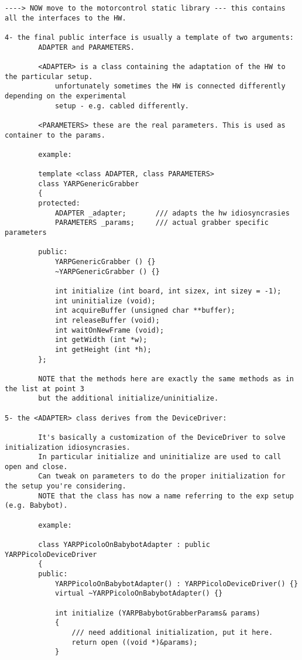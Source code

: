 \begin{verbatim}



----> NOW move to the motorcontrol static library --- this contains all the interfaces to the HW.

4- the final public interface is usually a template of two arguments:
		ADAPTER and PARAMETERS.

		<ADAPTER> is a class containing the adaptation of the HW to the particular setup. 
			unfortunately sometimes the HW is connected differently depending on the experimental
			setup - e.g. cabled differently.

		<PARAMETERS> these are the real parameters. This is used as container to the params.

		example:

		template <class ADAPTER, class PARAMETERS>
		class YARPGenericGrabber
		{
		protected:
			ADAPTER _adapter;		/// adapts the hw idiosyncrasies
			PARAMETERS _params;		/// actual grabber specific parameters

		public:
			YARPGenericGrabber () {}
			~YARPGenericGrabber () {}

			int initialize (int board, int sizex, int sizey = -1);
			int uninitialize (void);
			int acquireBuffer (unsigned char **buffer);
			int releaseBuffer (void);
			int waitOnNewFrame (void);
			int getWidth (int *w);
			int getHeight (int *h);
		};

		NOTE that the methods here are exactly the same methods as in the list at point 3
		but the additional initialize/uninitialize.

5- the <ADAPTER> class derives from the DeviceDriver: 

		It's basically a customization of the DeviceDriver to solve initialization idiosyncrasies.
		In particular initialize and uninitialize are used to call open and close.
		Can tweak on parameters to do the proper initialization for the setup you're considering.
		NOTE that the class has now a name referring to the exp setup (e.g. Babybot).

		example:

		class YARPPicoloOnBabybotAdapter : public YARPPicoloDeviceDriver
		{
		public:
			YARPPicoloOnBabybotAdapter() : YARPPicoloDeviceDriver() {}
			virtual ~YARPPicoloOnBabybotAdapter() {}

			int initialize (YARPBabybotGrabberParams& params)
			{
				/// need additional initialization, put it here.
				return open ((void *)&params);
			}


\end{verbatim}
